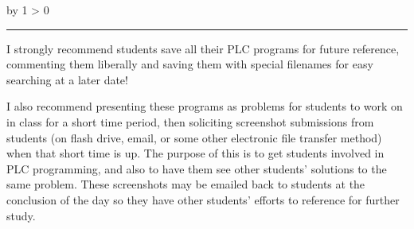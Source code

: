 \documentclass[12pt,a4paper]{article}
\def\notes{
           \advance\explnum by 1
           \ifnum \explnum > 0
                \hrule
                \vskip 3pt
                \leftline{Notes \the\explnum}
                \vskip 3pt \fi}
\begin{document}
\notes{} 

I strongly recommend students save all their PLC programs for future reference, commenting them liberally and saving them with special filenames for easy searching at a later date!

\vskip 10pt

I also recommend presenting these programs as problems for students to work on in class for a short time period, then soliciting screenshot submissions from students (on flash drive, email, or some other electronic file transfer method) when that short time is up.  The purpose of this is to get students involved in PLC programming, and also to have them see other students' solutions to the same problem.  These screenshots may be emailed back to students at the conclusion of the day so they have other students' efforts to reference for further study.


\vfil \eject 
\end{document}
